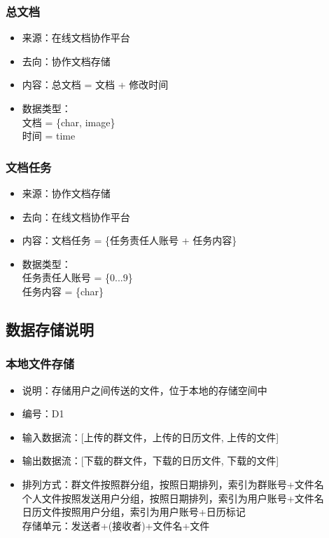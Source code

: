             \subsubsection{总文档}
            \begin{itemize}
            \item 来源：在线文档协作平台
            \item 去向：协作文档存储
            \item 内容：总文档 = 文档 + 修改时间
            \item 数据类型：\\
            文档 = \{char, image\}\\
            时间 = time\\
            
            \end{itemize}

            \subsubsection{文档任务}
            \begin{itemize}
            \item 来源：协作文档存储
            \item 去向：在线文档协作平台
            \item 内容：文档任务 = \{任务责任人账号 + 任务内容\}
            \item 数据类型：\\
            任务责任人账号 = \{0...9\}\\
            任务内容 = \{char\}\\
              
            \end{itemize}


        \subsection{数据存储说明}
            \subsubsection{本地文件存储}
            \begin{itemize}
                \item 说明：存储用户之间传送的文件，位于本地的存储空间中
                \item 编号：D1
                \item 输入数据流：[上传的群文件，上传的日历文件, 上传的文件]
                \item 输出数据流：[下载的群文件，下载的日历文件, 下载的文件]
                \item 排列方式：群文件按照群分组，按照日期排列，索引为群账号+文件名\\
                               个人文件按照发送用户分组，按照日期排列，索引为用户账号+文件名\\
                               日历文件按照用户分组，索引为用户账号+日历标记\\
                               存储单元：发送者+(接收者)+文件名+文件\\
            \end{itemize}

